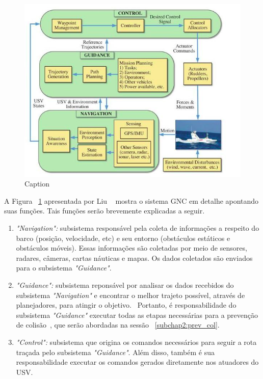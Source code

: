         \begin{figure}
            \centering
            \includegraphics[width=\textwidth]{fig/gnc_system.png}
            \caption{Caption}
            \label{fig:gnc_system}
        \end{figure}
    
        A Figura ~\ref{fig:gnc_system} apresentada por Liu ~\cite{LIU201671} mostra o sistema GNC em detalhe apontando suas funções. Tais funções serão brevemente explicadas a seguir.
        
        \begin{enumerate}
            \item [1] \textit{"Navigation":} subsistema responsável pela coleta de informações a respeito do barco (posição, velocidade, etc) e seu entorno (obstáculos estáticos e obstáculos móveis). Essas informações são coletadas por meio de sensores, radares, câmeras, cartas náuticas e mapas. Os dados coletados são enviados para o subsistema \textit{"Guidance"}.~\cite{JURAK2020}
            
            \item [2] \textit{"Guidance":} subsistema reponsável por analisar os dados recebidos do subsistema \textit{"Navigation"} e encontrar o melhor trajeto possível, através de planejadores, para atingir o objetivo.~\cite{JURAK2020} Portanto, é responsabilidade do subsistema \textit{"Guidance"} executar todas as etapas necessárias para a prevenção de colisão~\cite{HUANG2020451}, que serão abordadas na sessão ~\ref{subchap2:prev_col}.
            
            \item [3] \textit{"Control":} subsistema que origina os comandos necessários para seguir a rota traçada pelo subsistema \textit{"Guidance"}. Além disso, também é sua responsabilidade executar os comandos gerados diretamente nos atuadores do USV.~\cite{JURAK2020}
        \end{enumerate}
    
